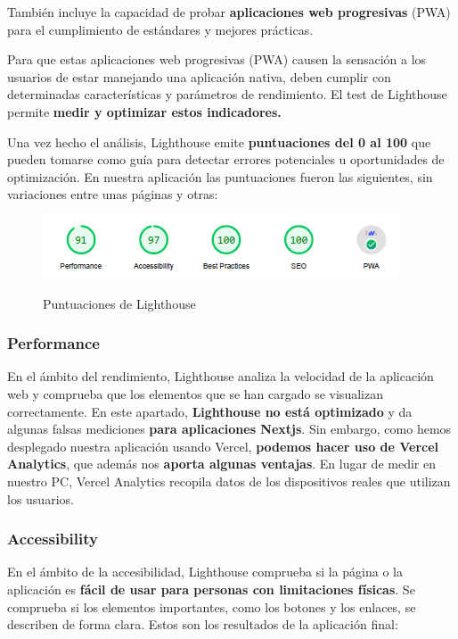 \documentclass[12pt,twoside,titlepage]{report}
\begin{document}
También incluye la capacidad de probar \textbf{aplicaciones web progresivas} (PWA) para el cumplimiento de estándares y mejores prácticas.

Para que estas aplicaciones web progresivas (PWA) causen la sensación a los usuarios de estar manejando una aplicación nativa, deben cumplir con determinadas características y parámetros de rendimiento. El test de Lighthouse permite \textbf{medir y optimizar estos indicadores.}

Una vez hecho el análisis, Lighthouse emite \textbf{puntuaciones del 0 al 100} que pueden tomarse como guía para detectar errores potenciales u oportunidades de optimización. En nuestra aplicación las puntuaciones fueron las siguientes, sin variaciones entre unas páginas y otras:

\begin{figure}[H]
    \centering
    \includegraphics[scale=1.2]{Lighthouse/Resumen}
    \label{fig:Lighthouse_resumen}
    \caption{Puntuaciones de Lighthouse}
\end{figure}

\subsubsection{Performance}

En el ámbito del rendimiento, Lighthouse analiza la velocidad de la aplicación web y comprueba que los elementos que se han cargado se visualizan correctamente. En este apartado, \textbf{Lighthouse no está optimizado} y da algunas falsas mediciones \textbf{para aplicaciones Nextjs}. Sin embargo, como hemos desplegado nuestra aplicación usando Vercel, \textbf{podemos hacer uso de Vercel Analytics}, que además nos \textbf{aporta algunas ventajas}. En lugar de medir en nuestro PC, Vercel Analytics recopila datos de los dispositivos reales que utilizan los usuarios. 

\subsubsection{Accessibility}

En el ámbito de la accesibilidad, Lighthouse comprueba si la página o la aplicación es \textbf{fácil de usar para personas con limitaciones físicas}. Se comprueba si los elementos importantes, como los botones y los enlaces, se describen de forma clara. Estos son los resultados de la aplicación final:
\end{document}
